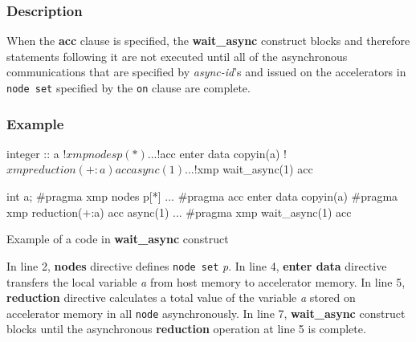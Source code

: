 \subsubsection*{Description}
When the {\bf acc} clause is specified,
the {\bf wait\_async} construct blocks and therefore
statements following it are not executed until all of the asynchronous
communications that are specified by {\it async-id}'s and issued on the accelerators in
{\tt node set} specified by the {\tt on} clause are complete.

\subsubsection*{Example}
\begin{myfigure}
\begin{minipage}{0.45\hsize}
\begin{center}
\begin{XACCFexampleL}
integer :: a
!$xmp nodes p(*)
...
!$acc enter data copyin(a)
!$xmp reduction(+:a) acc async(1)
...
!$xmp wait_async(1) acc
\end{XACCFexampleL}
\end{center}
\end{minipage}
%
\begin{minipage}{0.53\hsize}
\begin{center}
\begin{XACCCexampleR}
int a;
#pragma xmp nodes p[*]
...
#pragma acc enter data copyin(a)
#pragma xmp reduction(+:a) acc async(1)
...
#pragma xmp wait_async(1) acc
\end{XACCCexampleR}
\end{center}
\end{minipage}
\caption{Example of a code in {\XACC} {\bf wait\_async} construct}\label{code:waitasync}
\end{myfigure}

In line 2,
{\XMP} {\bf nodes} directive defines {\tt node set} {\it p}.
In line 4,
{\OACC} {\bf enter data} directive transfers the local variable {\it a} from host memory to accelerator memory.
In line 5,
{\XACC} {\bf reduction} directive calculates a total value of the variable {\it a} stored on accelerator
memory in all {\tt node} asynchronously.
In line 7,
{\XACC} {\bf wait\_async} construct blocks until the asynchronous {\bf reduction} operation at line 5 is complete.

